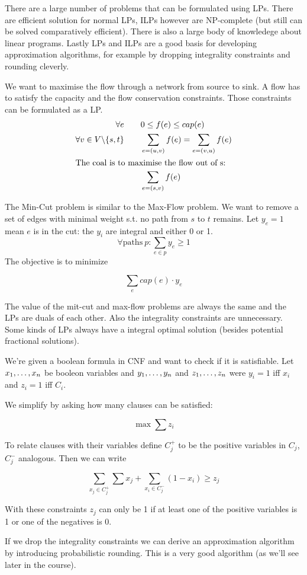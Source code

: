 \begin{itemize}
There are a large number of problems that can be formulated using LPs. There are efficient solution for normal LPs, ILPs however are NP-complete (but still can be solved comparatively efficient). There is also a large body of knowledege about linear programs. Lastly LPs and ILPs are a good basis for developing approximation algorithms, for example by dropping integrality constraints and rounding cleverly.

\begin{Ex} We want to maximise the flow through a network from source to sink. A flow has to satisfy the capacity and the flow conservation constraints. Those constraints can be formulated as a LP.
\begin{align*}
\forall e\qquad & 0\leq f(e)\leq cap(e)\\
\forall v\in V\backslash \{s,t\}\qquad & \sum_{e=(u,v)} f(e) = \sum_{e=(v,u)} f(e)\\
\intertext{The coal is to maximise the flow out of s:}
 &\sum_{e=(s,v)} f(e)
\end{align*}
\end{Ex}

\begin{Ex} The Min-Cut problem is similar to the Max-Flow problem. We want to remove a set of edges with minimal weight s.t. no path from $s$ to $t$ remains. Let $y_e=1$ mean $e$ is in the cut: the $y_i$ are integral and either 0 or 1.
\[\forall \mbox{paths}\ p: \sum_{e\in p} y_e \geq 1\]
The objective is to minimize 

\[\sum_e cap(e)\cdot y_e\]

The value of the mit-cut and max-flow problems are always the same and the LPs are duals of each other. Also the integrality constraints are unnecessary. Some kinds of LPs always have a integral optimal solution (besides potential fractional solutions).
\end{Ex}

\begin{Ex}[Satisfiability] We're given a boolean formula in CNF and want to check if it is satisfiable. Let ${x}_1,\ldots,{x}_n$ be booleon variables and ${y}_1,\ldots,{y}_n$ and ${z}_1,\ldots,{z}_n$ were $y_i=1$ iff $x_i$ and $z_i=1$ iff $C_i$.

We simplify by asking how many clauses can be satisfied:

\[\max \sum z_i\]

To relate clauses with their variables define $C_j^+$ to be the positive variables in $C_j$, $C_j^-$ analogous. Then we can write 

\[\sum_{x_j\in C_j^+} \sum x_j + \sum_{x_i \in C_j^-} (1-x_i) \geq z_j\]

With these constraints $z_j$ can only be 1 if at least one of the positive variables is 1 or one of the negatives is 0.

If we drop the integrality constraints we can derive an approximation algorithm by introducing probabilistic rounding. This is a very good algorithm (as we'll see later in the course).
\end{Ex}
\end{itemize}